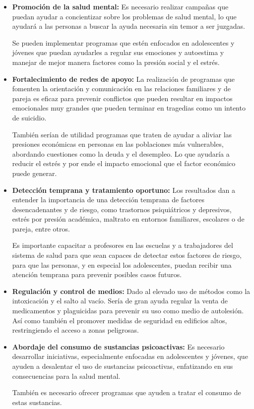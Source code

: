 \documentclass[
]{article}
\begin{document}
\begin{itemize}
\item
  \textbf{Promoción de la salud mental:} Es necesario realizar campañas
  que puedan ayudar a concientizar sobre los problemas de salud mental,
  lo que ayudará a las personas a buscar la ayuda necesaria sin temor a
  ser juzgadas.

  Se pueden implementar programas que estén enfocados en adolescentes y
  jóvenes que puedan ayudarles a regular sus emociones y autoestima y
  manejar de mejor manera factores como la presión social y el estrés.
\item
  \textbf{Fortalecimiento de redes de apoyo:} La realización de
  programas que fomenten la orientación y comunicación en las relaciones
  familiares y de pareja es eficaz para prevenir conflictos que pueden
  resultar en impactos emocionales muy grandes que pueden terminar en
  tragedias como un intento de suicidio.

  También serían de utilidad programas que traten de ayudar a aliviar
  las presiones económicas en personas en las poblaciones más
  vulnerables, abordando cuestiones como la deuda y el desempleo. Lo que
  ayudaría a reducir el estrés y por ende el impacto emocional que el
  factor económico puede generar.
\item
  \textbf{Detección temprana y tratamiento oportuno:} Los resultados dan
  a entender la importancia de una detección temprana de factores
  desencadenantes y de riesgo, como trastornos psiquiátricos y
  depresivos, estrés por presión académica, maltrato en entornos
  familiares, escolares o de pareja, entre otros.

  Es importante capacitar a profesores en las escuelas y a trabajadores
  del sistema de salud para que sean capaces de detectar estos factores
  de riesgo, para que las personas, y en especial los adolescentes,
  puedan recibir una atención temprana para prevenir posibles casos
  futuros.
\item
  \textbf{Regulación y control de medios:} Dado al elevado uso de
  métodos como la intoxicación y el salto al vacío. Sería de gran ayuda
  regular la venta de medicamentos y plaguicidas para prevenir su uso
  como medio de autolesión. Así como también el promover medidas de
  seguridad en edificios altos, restringiendo el acceso a zonas
  peligrosas.
\item
  \textbf{Abordaje del consumo de sustancias psicoactivas:} Es necesario
  desarrollar iniciativas, especialmente enfocadas en adolescentes y
  jóvenes, que ayuden a desalentar el uso de sustancias psicoactivas,
  enfatizando en sus consecuencias para la salud mental.

  También es necesario ofrecer programas que ayuden a tratar el consumo
  de estas sustancias.
\end{itemize}
\end{document}
